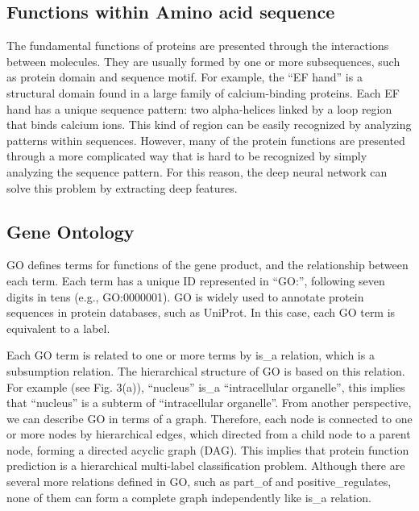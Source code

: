 \documentclass{article}
\begin{document}
    \subsection{Functions within Amino acid sequence}
        The fundamental functions of proteins are presented through the interactions between molecules. They are usually formed by one or more subsequences, such as protein domain and sequence motif. For example, the ``EF hand'' is a structural domain found in a large family of calcium-binding proteins. Each EF hand has a unique sequence pattern: two alpha-helices linked by a loop region that binds calcium ions. This kind of region can be easily recognized by analyzing patterns within sequences. However, many of the protein functions are presented through a more complicated way that is hard to be recognized by simply analyzing the sequence pattern. For this reason, the deep neural network can solve this problem by extracting deep features. 
    \subsection{Gene Ontology}
        GO defines terms for functions of the gene product, and the relationship between each term. Each term has a unique ID represented in ``GO:'', following seven digits in tens (e.g., GO:0000001). GO is widely used to annotate protein sequences in protein databases, such as UniProt. In this case, each GO term is equivalent to a label.\par
        
        Each GO term is related to one or more terms by is\_a relation, which is a subsumption relation. The hierarchical structure of GO is based on this relation. For example (see Fig. 3(a)), ``nucleus'' is\_a ``intracellular organelle'', this implies that ``nucleus'' is a subterm of ``intracellular organelle''. From another perspective, we can describe GO in terms of a graph. Therefore, each node is connected to one or more nodes by hierarchical edges, which directed from a child node to a parent node, forming a directed acyclic graph (DAG). This implies that protein function prediction is a hierarchical multi-label classification problem. Although there are several more relations defined in GO, such as part\_of and positive\_regulates, none of them can form a complete graph independently like is\_a relation. \par
        
\end{document}
